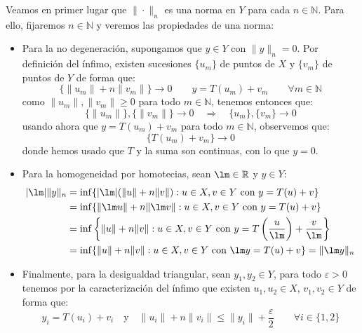 \begin{ejercicio}
    \noindent
    Veamos en primer lugar que $\|\cdot \|_n$ es una norma en $Y$ para cada $n\in \mathbb{N}$. Para ello, fijaremos $n\in \mathbb{N}$ y veremos las propiedades de una norma:
    \begin{itemize}
        \item Para la no degeneración, supongamos que $y\in Y$ con $\|y\|_n = 0$. Por definición del ínfimo, existen sucesiones $\{u_m\}$ de puntos de $X$ y $\{v_m\}$ de puntos de $Y$ de forma que:
            \begin{equation*}
                \{\|u_m\| + n\|v_m\|\} \to 0 \qquad y = T(u_m)+ v_m \qquad \forall m\in \mathbb{N}
            \end{equation*}
            como $\|u_m\|, \|v_m\|\geq 0$ para todo $m\in \mathbb{N}$, tenemos entonces que:
            \begin{equation*}
                \{\|u_m\|\},\{\|v_m\|\}\to 0 \quad \Longrightarrow \quad  \{u_m\},\{v_m\} \to 0
            \end{equation*}
            usando ahora que $y = T(u_m)+v_m$ para todo $m\in \mathbb{N}$, observemos que:
            \begin{equation*}
                \{T(u_m)+v_m\}\to 0
            \end{equation*}
            donde hemos usado que $T$ y la suma son continuas, con lo que $y=0$.
        \item Para la homogeneidad por homotecias, sean $\lm\in \mathbb{R}$ y $y\in Y$:
            \begin{align*}
                |\lm|\|y\|_n &= \inf\{|\lm|(\|u\|+n\|v\|) : u\in X, v\in Y \text{\ con\ } y=T(u)+v\}  \\
                             &= \inf\{\|\lm u\| + n\|\lm v\| : u\in X, v\in Y \text{\ con\ } y=T(u)+v\}  \\
                             &= \inf\left\{\|u\| + n\|v\| : u\in X, v\in Y \text{\ con\ } y=T\left(\frac{u}{\lm}\right)+\frac{v}{\lm}\right\}   \\
                             &= \inf\{\|u\| + n\|v\| : u\in X, v\in Y \text{\ con\ } \lm y=T(u)+v\}  = \|\lm y\|_n
            \end{align*}
        \item Finalmente, para la desigualdad triangular, sean $y_1,y_2\in Y$, para todo $\varepsilon>0$ tenemos por la caracterización del ínfimo que existen $u_1,u_2\in X$, $v_1,v_2\in Y$ de forma que:
            \begin{equation*}
                y_i = T(u_i) + v_i \quad \text{y}\quad \|u_i\| + n\|v_i\| \leq \|y_i\|+\frac{\varepsilon}{2}\qquad \forall i \in \{1,2\}

\end{equation*}
\end{itemize}
\end{ejercicio}

